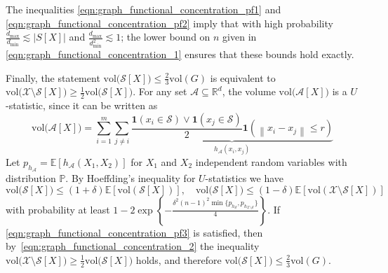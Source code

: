 \documentclass{article}
\newcommand{\Reals}{\mathbb{R}}
\newcommand{\norm}[1]{\left\lVert#1\right\rVert}
\newcommand{\abs}[1]{\left \lvert #1 \right \rvert}
\newcommand{\vol}{\mathrm{vol}}
\newcommand{\set}[1]{\left\{#1\right\}}
\newcommand{\Pbb}{\mathbb{P}}
\newcommand{\1}{\mathbf{1}}
\theoremstyle{alden}
\theoremstyle{aldenthm}
\theoremstyle{remark}
\begin{document}
The inequalities \eqref{eqn:graph_functional_concentration_pf1} and \eqref{eqn:graph_functional_concentration_pf2} imply that with high probability $\frac{d_{\max}}{d_{\min}} \lesssim \abs{S[X]}$ and $\frac{d_{\max}}{d_{\min}^2} \lesssim 1$; the lower bound on $n$ given in \eqref{eqn:graph_functional_concentration_1} ensures that these bounds hold exactly.

Finally, the statement $\vol\bigl(\mathcal{S}[X]\bigr) \leq \frac{2}{3}\vol(G)$ is equivalent to $\vol\bigl(\mathcal{X}\setminus\mathcal{S}[X]\bigr) \geq \frac{1}{2}\vol\bigl(\mathcal{S}[X]\bigr)$. For any set $\mathcal{A} \subseteq \Reals^d$, the volume $\vol\bigl(\mathcal{A}[X]\bigr)$ is a $U$-statistic, since it can be written as
\begin{equation*}
\vol\bigl(\mathcal{A}[X]\bigr) = \sum_{i = 1}^{m} \sum_{j \neq i} \underbrace{\frac{\1(x_i \in \mathcal{S}) \vee \1(x_j \in \mathcal{S})}{2} \1(\norm{x_i - x_j} \leq r)}_{h_\mathcal{A}(x_i,x_j)}
\end{equation*}
Let $p_{h_\mathcal{A}} = \mathbb{E}[h_\mathcal{A}(X_1,X_2)]$ for $X_1$ and $X_2$ independent random variables with distribution $\Pbb$. By Hoeffding's inequality for $U$-statistics we have
\begin{equation}
\label{eqn:graph_functional_concentration_pf3}
\vol\bigl(\mathcal{S}[X]\bigr) \leq (1 + \delta)\mathbb{E}\left[\vol(\mathcal{S}[X])\right], \quad \vol\bigl(\mathcal{S}[X]\bigr) \leq (1 - \delta)\mathbb{E}\left[\vol(\mathcal{X}\setminus\mathcal{S}[X])\right]
\end{equation}
with probability at least $1 - 2\exp\set{-\frac{\delta^2 (n - 1)^2 \min\{p_{h_\mathcal{S}}, p_{h_{\mathcal{X}\setminus{\mathcal{S}}}}\}}{4}}$. If \eqref{eqn:graph_functional_concentration_pf3} is satisfied, then by~\eqref{eqn:graph_functional_concentration_2} the inequality $\vol\bigl(\mathcal{X}\setminus\mathcal{S}[X]\bigr) \geq \frac{1}{2}\vol\bigl(\mathcal{S}[X]\bigr)$ holds, and therefore $\vol\bigl(\mathcal{S}[X]\bigr) \leq \frac{2}{3}\vol(G)$.
\end{document}
